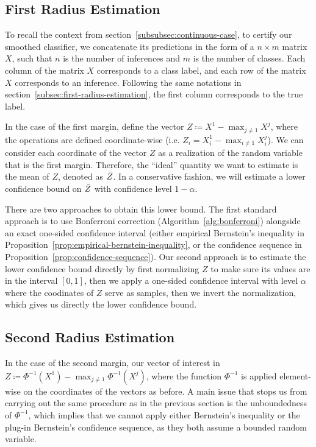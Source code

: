 \subsection{First Radius Estimation}\label{subsec:first-radius-estimation-continuous}
To recall the context from section~\ref{subsubsec:continuous-case}, to certify our smoothed classifier, we concatenate its predictions in the form of a $n \times m$ matrix $X$, such that $n$ is the number of inferences and $m$ is the number of classes.
Each column of the matrix $X$ corresponds to a class label, and each row of the matrix $X$ corresponds to an inference.
Following the same notations in section~\ref{subsec:first-radius-estimation}, the first column corresponds to the true label.

In the case of the first margin, define the vector $Z\coloneqq X^{1}-\max_{j \neq 1} X^{j}$, where the operations are defined coordinate-wise (i.e. $Z_i = X^{1}_i - \max_{i \neq 1} X^{j}_i$).
We can consider each coordinate of the vector $Z$ as a realization of the random variable that is the first margin.
Therefore, the ``ideal'' quantity we want to estimate is the mean of $Z$, denoted as $\Bar{Z}$.
In a conservative fashion, we will estimate a lower confidence bound on $\Bar{Z}$ with confidence level $1-\alpha$.

There are two approaches to obtain this lower bound.
The first standard approach is to use Bonferroni correction (Algorithm~\ref{alg:bonferroni}) alongside an exact one-sided confidence interval (either empirical Bernstein's inequality in Proposition~\ref{prop:empirical-bernstein-inequality}, or the confidence sequence in Proposition~\ref{prop:confidence-sequence}).
Our second approach is to estimate the lower confidence bound directly by first normalizing $Z$ to make sure its values are in the interval $[0,1]$, then we apply a one-sided confidence interval with level $\alpha$ where the coodinates of $Z$ serve as samples, then we invert the normalization, which gives us directly the lower confidence bound.

\subsection{Second Radius Estimation}\label{subsec:second-radius-estimation-continuous}
In the case of the second margin, our vector of interest in $Z\coloneqq\Phi^{-1}(X^1)-\max_{j \neq 1}\Phi^{-1}(X^j)$, where the function $\Phi^{-1}$ is applied element-wise on the coordinates of the vectors as before.
A main issue that stops us from carrying out the same procedure as in the previous section is the unboundedness of $\Phi^{-1}$, which implies that we cannot apply either Bernstein's inequality or the plug-in Bernstein's confidence sequence, as they both assume a bounded random variable.

